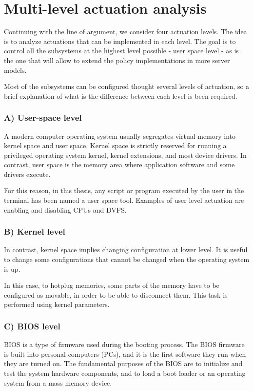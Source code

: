 \section{Multi-level actuation analysis}

Continuing with the line of argument, we consider four actuation levels. The idea is to analyze actuations that can be implemented in each level. The goal is to control all the subsystems at the highest level possible - user space level - as is the one that will allow to extend the policy implementations in more server models.

Most of the subsystems can be configured thought several levels of actuation, so a brief explanation of what is the difference between each level is been required.

\subsubsection{A) User-space level}

A modern computer operating system usually segregates virtual memory into kernel space and user space. Kernel space is strictly reserved for running a privileged operating system kernel, kernel extensions, and most device drivers. In contrast, user space is the memory area where application software and some drivers execute.

For this reason, in this thesis, any script or program executed by the user in the terminal has been named a user space tool. Examples of user level actuation are enabling and disabling CPUs and DVFS.

\subsubsection{B) Kernel level}

In contrast, kernel space implies changing configuration at lower level. It is useful to change some configurations that cannot be changed when the operating system is up.

In this case, to hotplug memories, some parts of the memory have to be configured as movable, in order to be able to disconnect them. This task is performed using kernel parameters.

\subsubsection{C) BIOS level}

BIOS is a type of firmware used during the booting process. The BIOS firmware is built into personal computers (PCs), and it is the first software they run when they are turned on. The fundamental purposes of the BIOS are to initialize and test the system hardware components, and to load a boot loader or an operating system from a mass memory device. 


